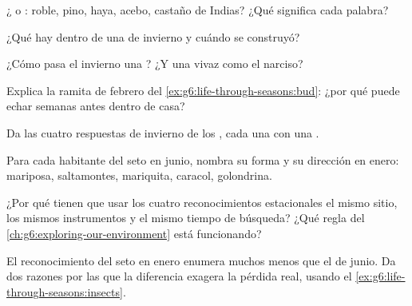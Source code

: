 \begin{exercise}[$\star$]\label{exo:g6:life-through-seasons:2}
¿ o : roble, pino, haya, acebo, castaño de
Indias? ¿Qué significa cada palabra?
\end{exercise}

\begin{exercise}[$\star$]\label{exo:g6:life-through-seasons:3}
¿Qué hay dentro de una  de invierno y cuándo se construyó?
\end{exercise}

\begin{exercise}[$\star$]\label{exo:g6:life-through-seasons:4}
¿Cómo pasa el invierno una ? ¿Y una vivaz como el narciso?
\end{exercise}

\begin{exercise}[$\star$]\label{exo:g6:life-through-seasons:5}
Explica la ramita de febrero del \cref{ex:g6:life-through-seasons:bud}:
¿por qué puede echar  semanas antes dentro de casa?
\end{exercise}

\begin{exercise}[$\star$]\label{exo:g6:life-through-seasons:6}
Da las cuatro respuestas de invierno de los , cada una con una
.
\end{exercise}

\begin{exercise}[$\star\star$]\label{exo:g6:life-through-seasons:7}
Para cada habitante del seto en junio, nombra su forma y su dirección
en enero: mariposa, saltamontes, mariquita, caracol, golondrina.
\end{exercise}

\begin{exercise}[$\star\star$]\label{exo:g6:life-through-seasons:8}
¿Por qué tienen que usar los cuatro reconocimientos estacionales el
mismo sitio, los mismos instrumentos y el mismo tiempo de búsqueda?
¿Qué regla del \cref{ch:g6:exploring-our-environment} está funcionando?
\end{exercise}

\begin{exercise}[$\star\star$]\label{exo:g6:life-through-seasons:9}
El reconocimiento del seto en enero enumera muchos menos 
que el de junio. Da dos razones por las que la diferencia exagera la
pérdida real, usando el \cref{ex:g6:life-through-seasons:insects}.
\end{exercise}

